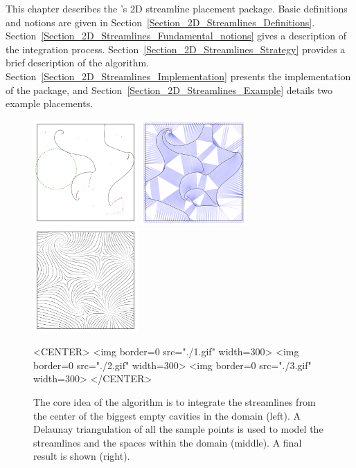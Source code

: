 \newcommand{\streamlinecomment}[1]{}

This chapter describes the \cgal's 2D streamline placement package.
Basic definitions and notions are given in
Section~\ref{Section_2D_Streamlines_Definitions}.
Section~\ref{Section_2D_Streamlines_Fundamental_notions} gives a
description of the integration
process. Section~\ref{Section_2D_Streamlines_Strategy} provides a
brief description of the algorithm.
Section~\ref{Section_2D_Streamlines_Implementation} presents the
implementation of the package, and
Section~\ref{Section_2D_Streamlines_Example} details two example
placements.

\begin{figure}[h!]
\begin{ccTexOnly}
\begin{center}
\includegraphics[width=4cm]{Stream_lines_2/1} \hspace*{0.5cm} 
\includegraphics[width=4cm]{Stream_lines_2/2} \hspace*{0.5cm} 
\includegraphics[width=4cm]{Stream_lines_2/3}
\end{center}
\end{ccTexOnly}

\caption{The core idea of the algorithm is to integrate the
streamlines from the center of the biggest empty cavities in the
domain (left). A Delaunay triangulation of all the sample points is
used to model the streamlines and the spaces within the domain
(middle). A final result is shown (right).}


\label{illustration}
\begin{ccHtmlOnly}
<CENTER>
<img border=0 src="./1.gif" width=300>
<img border=0 src="./2.gif" width=300>
<img border=0 src="./3.gif" width=300>
</CENTER>
\end{ccHtmlOnly}
\end{figure}

